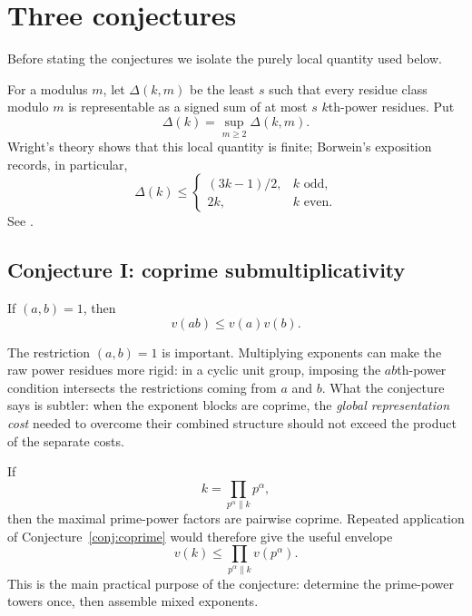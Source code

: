 \documentclass[../Axiomathic.tex]{subfiles}
\begin{document}
\section{Three conjectures}

Before stating the conjectures we isolate the purely local quantity used below.

\begin{defn}
For a modulus $m$, let $\Delta(k,m)$ be the least $s$ such that every residue class modulo $m$ is representable as a signed sum of at most $s$ $k$th-power residues.  Put
\[
  \Delta(k)=\sup_{m\ge2}\Delta(k,m).
\]
Wright's theory shows that this local quantity is finite; Borwein's exposition records, in particular,
\[
  \Delta(k)\le
  \begin{cases}
    (3k-1)/2,&k\text{ odd},\\
    2k,&k\text{ even}.
  \end{cases}
\]
See \cite[Sec.~4.1]{Borwein2002}.
\end{defn}

\subsection{Conjecture I: coprime submultiplicativity}

\begin{conj}\label{conj:coprime}
If $(a,b)=1$, then
\begin{equation}\label{eq:coprime-submult}
  \boxed{v(ab)\le v(a)v(b).}
\end{equation}
\end{conj}

The restriction $(a,b)=1$ is important.  Multiplying exponents can make the raw power residues more rigid: in a cyclic unit group, imposing the $ab$th-power condition intersects the restrictions coming from $a$ and $b$.  What the conjecture says is subtler: when the exponent blocks are coprime, the \emph{global representation cost} needed to overcome their combined structure should not exceed the product of the separate costs.

If
\[
  k=\prod_{p^\alpha\parallel k}p^\alpha,
\]
then the maximal prime-power factors are pairwise coprime.  Repeated application of Conjecture~\ref{conj:coprime} would therefore give the useful envelope
\begin{equation}\label{eq:prime-power-envelope}
  \boxed{v(k)\le\prod_{p^\alpha\parallel k}v(p^\alpha).}
\end{equation}
This is the main practical purpose of the conjecture: determine the prime-power towers once, then assemble mixed exponents.
\end{document}
